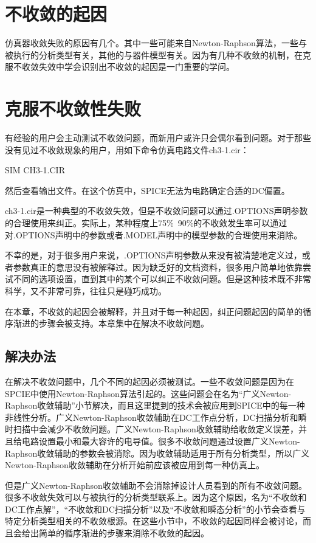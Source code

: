 \section{不收敛的起因}
仿真器收敛失败的原因有几个。其中一些可能来自Newton-Raphson算法，一些与被执行的分析类型有关，其他的与器件模型有关。因为有几种不收敛的机制，在克服不收敛失效中学会识别出不收敛的起因是一门重要的学问。
\section{克服不收敛性失败}
有经验的用户会主动测试不收敛问题，而新用户或许只会偶尔看到问题。对于那些没有见过不收敛现象的用户，用如下命令仿真电路文件ch3-1.cir：

SIM CH3-1.CIR

然后查看输出文件。在这个仿真中，SPICE无法为电路确定合适的DC偏置。

ch3-1.cir是一种典型的不收敛失效，但是不收敛问题可以通过.OPTIONS声明参数的合理使用来纠正。实际上，某种程度上75\%~90\%的不收敛发生率可以通过对.OPTIONS声明中的参数或者.MODEL声明中的模型参数的合理使用来消除。

不幸的是，对于很多用户来说，.OPTIONS声明参数从来没有被清楚地定义过，或者参数真正的意思没有被解释过。因为缺乏好的文档资料，很多用户简单地依靠尝试不同的选项设置，直到其中的某个可以纠正不收敛问题。但是这种技术既不非常科学，又不非常可靠，往往只是碰巧成功。

在本章，不收敛的起因会被解释，并且对于每一种起因，纠正问题起因的简单的循序渐进的步骤会被支持。本章集中在解决不收敛问题。

\subsection{解决办法}
在解决不收敛问题中，几个不同的起因必须被测试。一些不收敛问题是因为在SPCIE中使用Newton-Raphson算法引起的。这些问题会在名为“广义Newton-Raphson收敛辅助”小节解决，而且这里提到的技术会被应用到SPICE中的每一种非线性分析。广义Newton-Raphson收敛辅助在DC工作点分析，DC扫描分析和瞬时扫描中会减少不收敛问题。广义Newton-Raphson收敛辅助给收敛定义误差，并且给电路设置最小和最大容许的电导值。很多不收敛问题通过设置广义Newton-Raphson收敛辅助的参数会被消除。因为收敛辅助适用于所有分析类型，所以广义Newton-Raphson收敛辅助在分析开始前应该被应用到每一种仿真上。

但是广义Newton-Raphson收敛辅助不会消除掉设计人员看到的所有不收敛问题。很多不收敛失效可以与被执行的分析类型联系上。因为这个原因，名为“不收敛和DC工作点解”，“不收敛和DC扫描分析”以及“不收敛和瞬态分析”的小节会查看与特定分析类型相关的不收敛根源。在这些小节中，不收敛的起因同样会被讨论，而且会给出简单的循序渐进的步骤来消除不收敛的起因。

